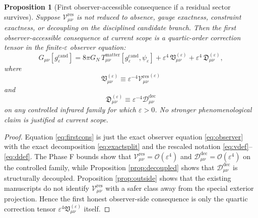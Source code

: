\documentclass[11pt]{article}
\newcommand{\CandidateMetric}{g^{\mathrm{cand}}}
\newcommand{\ResidualCore}{\mathcal V_{\mu\nu}^{\mathrm{res}}}
\newcommand{\ResidualDec}{\mathcal D_{\mu\nu}^{\mathrm{dec}}}
\newcommand{\epsIR}{\varepsilon}
\newtheorem{proposition}{Proposition}
\begin{document}
\begin{proposition}[First observer-accessible consequence if a residual sector survives]
\label{prop:consequence}
Suppose \(\ResidualCore\) is not reduced to absence, gauge exactness, constraint exactness, or decoupling on the disciplined candidate branch. Then the first observer-accessible consequence at current scope is a quartic-order correction tensor in the finite-\(\epsIR\) observer equation:
\begin{equation}
G_{\mu\nu}[\CandidateMetric_{\epsIR}]
=
8\pi G_N\,T_{\mu\nu}^{\mathrm{matter}}[\CandidateMetric_{\epsIR},\psi_{\epsIR}]
+\epsIR^4\,\mathfrak V_{\mu\nu}^{(\epsIR)}
+\epsIR^4\,\mathfrak D_{\mu\nu}^{(\epsIR)},
\label{eq:firstcons}
\end{equation}
where
\begin{equation}
\mathfrak V_{\mu\nu}^{(\epsIR)}
\equiv
\epsIR^{-4}{\ResidualCore}^{(\epsIR)}
\label{eq:vdef}
\end{equation}
and
\begin{equation}
\mathfrak D_{\mu\nu}^{(\epsIR)}
\equiv
\epsIR^{-4}\ResidualDec
\label{eq:ddef}
\end{equation}
on any controlled infrared family for which \(\epsIR>0\). No stronger phenomenological claim is justified at current scope.
\end{proposition}

\begin{proof}
Equation \eqref{eq:firstcons} is just the exact observer equation \eqref{eq:observer} with the exact decomposition \eqref{eq:exactsplit} and the rescaled notation \eqref{eq:vdef}--\eqref{eq:ddef}. The Phase F bounds show that \(\ResidualCore=\mathcal O(\epsIR^4)\) and \(\ResidualDec=\mathcal O(\epsIR^4)\) on the controlled family, while Proposition \ref{prop:decoupled} shows that \(\ResidualDec\) is structurally decoupled. Proposition \ref{prop:outside} shows that the existing manuscripts do not identify \(\ResidualCore\) with a safer class away from the special exterior projection. Hence the first honest observer-side consequence is only the quartic correction tensor \(\epsIR^4\mathfrak V_{\mu\nu}^{(\epsIR)}\) itself.
\end{proof}
\end{document}

